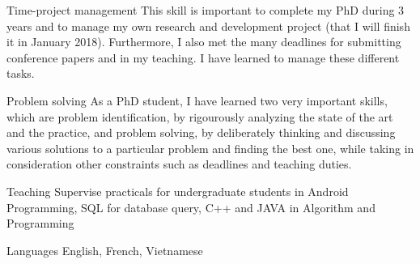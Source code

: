 \begin{cvskills}
\vspace{0.1cm}
\cvskill
{Time-project management} %
{This skill is important to complete my PhD during 3 years and to manage my own research and development project (that I will finish it in January 2018). Furthermore, I also met the many deadlines for submitting conference papers and in my teaching.
	I have learned to manage these different tasks.} %

\vspace{0.1cm}
\cvskill
{Problem solving} %
{As a PhD student, I have learned two very important skills, which are problem identification, by rigourously analyzing the state of the art and the practice, and problem solving, by deliberately thinking and discussing various solutions to a particular problem and finding the best one, while taking in consideration other constraints such as deadlines and teaching duties.} %

\vspace{0.1cm}
\cvskill
{Teaching}
{Supervise practicals for undergraduate students in Android Programming, SQL for database query, C++ and JAVA in Algorithm and Programming}

\vspace{0.1cm}
\cvskill
{Languages} %
{English, French, Vietnamese} %






\end{cvskills}